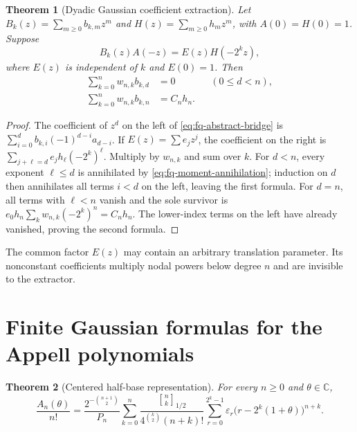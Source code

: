 \documentclass[11pt,oneside,openany]{book}
\newtheorem{theorem}{Theorem}[chapter]
\theoremstyle{definition}
\theoremstyle{remark}
\newcommand{\Qbinom}[3]{\genfrac{[}{]}{0pt}{}{#1}{#2}_{#3}}
\newcommand{\C}{\mathbb C}
\begin{document}
\begin{theorem}[Dyadic Gaussian coefficient extraction]
\label{thm:fq-coefficient-extraction}
Let $B_k(z)=\sum_{m\ge0}b_{k,m}z^m$ and
$H(z)=\sum_{m\ge0}h_mz^m$, with $A(0)=H(0)=1$.  Suppose
\begin{equation}
 B_k(z)A(-z)=E(z)H(-2^kz),
 \label{eq:fq-abstract-bridge}
\end{equation}
where $E(z)$ is independent of $k$ and $E(0)=1$.  Then
\begin{align}
 \sum_{k=0}^{n}w_{n,k}b_{k,d}&=0&& (0\le d<n),
 \label{eq:fq-extract-lower}\\
 \sum_{k=0}^{n}w_{n,k}b_{k,n}&=C_nh_n.
 \label{eq:fq-extract-top}
\end{align}
\end{theorem}

\begin{proof}
The coefficient of $z^d$ on the left of
\eqref{eq:fq-abstract-bridge} is
$\sum_{i=0}^{d}b_{k,i}(-1)^{d-i}a_{d-i}$.  If
$E(z)=\sum e_jz^j$, the coefficient on the right is
$\sum_{j+\ell=d}e_jh_\ell(-2^k)^\ell$.  Multiply by $w_{n,k}$ and sum over
$k$.  For $d<n$, every exponent $\ell\le d$ is annihilated by
\eqref{eq:fq-moment-annihilation}; induction on $d$ then annihilates all terms
$i<d$ on the left, leaving the first formula.  For $d=n$, all terms with
$\ell<n$ vanish and the sole survivor is
$e_0h_n\sum_kw_{n,k}(-2^k)^n=C_nh_n$.  The lower-index terms on the left have
already vanished, proving the second formula.
\end{proof}

The common factor $E(z)$ may contain an arbitrary translation parameter.  Its
nonconstant coefficients multiply nodal powers below degree $n$ and are
invisible to the extractor.

\section{Finite Gaussian formulas for the Appell polynomials}

\begin{theorem}[Centered half-base representation]
\label{thm:fq-centered-Appell}
For every $n\ge0$ and $\theta\in\C$,
\begin{equation}
 \boxed{
 \frac{A_n(\theta)}{n!}
 =\frac{2^{-\binom{n+1}{2}}}{P_n}
 \sum_{k=0}^{n}\frac{\Qbinom nk{1/2}}
 {4^{\binom k2}(n+k)!}
 \sum_{r=0}^{2^k-1}\varepsilon_r
 \bigl(r-2^k(1+\theta)\bigr)^{n+k}.}
 \label{eq:fq-centered-Appell}
\end{equation}
\end{theorem}
\end{document}
